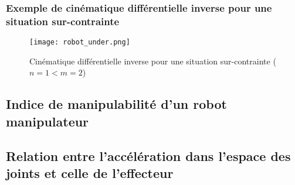 \subsubsection{Exemple de cinématique différentielle inverse pour une situation sur-contrainte}
\begin{figure}[H]
	\centering
		\texttt{[image: robot\_under.png]}
	\caption{Cinématique différentielle inverse pour une situation sur-contrainte ($n=1<m=2$)}
	\label{fig:robot_under}
\end{figure}



\newpage
\subsection{Indice de manipulabilité d'un robot manipulateur}




\newpage
\subsection{Relation entre l'accélération dans l'espace des joints et celle de l'effecteur}
\label{sec:accjointspace}


